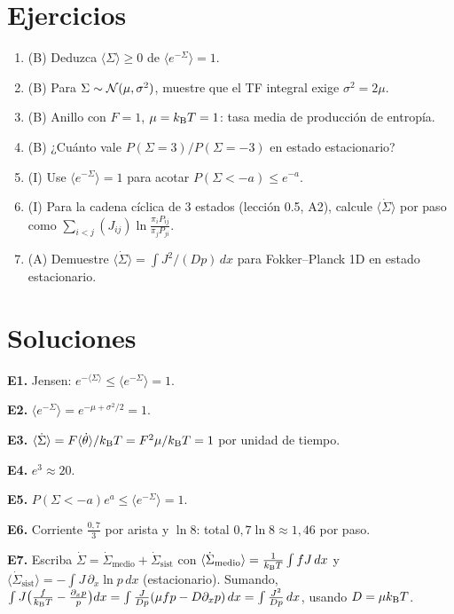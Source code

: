 \documentclass[11pt,a4paper]{article}
\begin{document}
\section{Ejercicios}
\begin{enumerate}[label=\textbf{E\arabic*.}]
\item (B) Deduzca $\langle\Sigma\rangle\ge0$ de $\langle e^{-\Sigma}\rangle=1$.
\item (B) Para $\Sigma\sim\mathcal{N}(\mu,\sigma^2)$, muestre que el TF integral exige $\sigma^2=2\mu$.
\item (B) Anillo con $F=1$, $\mu=k_{\mathrm B} T=1$: tasa media de producción de entropía.
\item (B) ¿Cuánto vale $P(\Sigma=3)/P(\Sigma=-3)$ en estado estacionario?
\item (I) Use $\langle e^{-\Sigma}\rangle=1$ para acotar $P(\Sigma<-a)\le e^{-a}$.
\item (I) Para la cadena cíclica de 3 estados (lección 0.5, A2), calcule $\langle\dot\Sigma\rangle$ por paso como $\sum_{i<j}(J_{ij})\ln\frac{\pi_iP_{ij}}{\pi_jP_{ji}}$.
\item (A) Demuestre $\langle\dot\Sigma\rangle=\int J^2/(Dp)\,dx$ para Fokker--Planck 1D en estado estacionario.
\end{enumerate}
\section{Soluciones}
\begin{solucion}
\textbf{E1.} Jensen: $e^{-\langle\Sigma\rangle}\le\langle e^{-\Sigma}\rangle=1$.

\textbf{E2.} $\langle e^{-\Sigma}\rangle=e^{-\mu+\sigma^2/2}=1$.

\textbf{E3.} $\langle\dot\Sigma\rangle=F\langle\dot\theta\rangle/k_{\mathrm B} T=F^2\mu/k_{\mathrm B} T=1$ por unidad de tiempo.

\textbf{E4.} $e^3\approx20$.

\textbf{E5.} $P(\Sigma<-a)e^{a}\le\langle e^{-\Sigma}\rangle=1$.

\textbf{E6.} Corriente $\frac{0{,}7}{3}$ por arista y $\ln8$: total $0{,}7\ln8\approx1{,}46$ por paso.

\textbf{E7.} Escriba $\dot\Sigma=\dot\Sigma_{\text{medio}}+\dot\Sigma_{\text{sist}}$ con $\langle\dot\Sigma_{\text{medio}}\rangle=\frac1{k_{\mathrm B} T}\int fJ\,dx$ y $\langle\dot\Sigma_{\text{sist}}\rangle=-\int J\,\partial_x\ln p\,dx$ (estacionario). Sumando, $\int J\big(\frac{f}{k_{\mathrm B} T}-\frac{\partial_xp}{p}\big)dx=\int\frac{J}{Dp}(\mu fp-D\partial_xp)\,dx=\int\frac{J^2}{Dp}\,dx$, usando $D=\mu k_{\mathrm B} T$.
\end{solucion}
\end{document}
